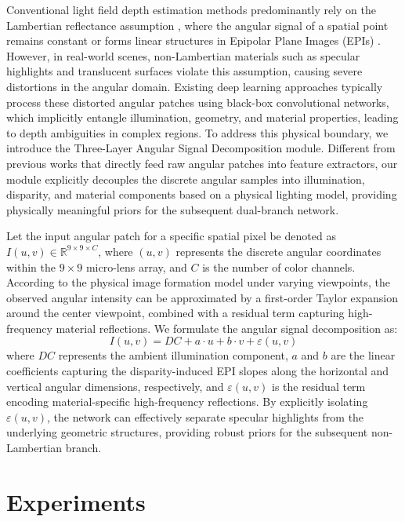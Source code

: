\documentclass[lettersize,journal]{IEEEtran}
\begin{document}
Conventional light field depth estimation methods predominantly rely on the Lambertian reflectance assumption \cite{realtime}, where the angular signal of a spatial point remains constant or forms linear structures in Epipolar Plane Images (EPIs) \cite{realtime}. However, in real-world scenes, non-Lambertian materials such as specular highlights and translucent surfaces violate this assumption, causing severe distortions in the angular domain. Existing deep learning approaches typically process these distorted angular patches using black-box convolutional networks, which implicitly entangle illumination, geometry, and material properties, leading to depth ambiguities in complex regions. To address this physical boundary, we introduce the Three-Layer Angular Signal Decomposition module. Different from previous works that directly feed raw angular patches into feature extractors, our module explicitly decouples the discrete angular samples into illumination, disparity, and material components based on a physical lighting model, providing physically meaningful priors for the subsequent dual-branch network.

Let the input angular patch for a specific spatial pixel be denoted as $I(u,v) \in \mathbb{R}^{9 \times 9 \times C}$, where $(u,v)$ represents the discrete angular coordinates within the $9 \times 9$ micro-lens array, and $C$ is the number of color channels. According to the physical image formation model under varying viewpoints, the observed angular intensity can be approximated by a first-order Taylor expansion around the center viewpoint, combined with a residual term capturing high-frequency material reflections. We formulate the angular signal decomposition as:
\begin{equation}
I(u,v) = DC + a \cdot u + b \cdot v + \varepsilon(u,v)
\end{equation}
where $DC$ represents the ambient illumination component, $a$ and $b$ are the linear coefficients capturing the disparity-induced EPI slopes along the horizontal and vertical angular dimensions, respectively, and $\varepsilon(u,v)$ is the residual term encoding material-specific high-frequency reflections. By explicitly isolating $\varepsilon(u,v)$, the network can effectively separate specular highlights from the underlying geometric structures, providing robust priors for the subsequent non-Lambertian branch.

\section{Experiments}
\end{document}
